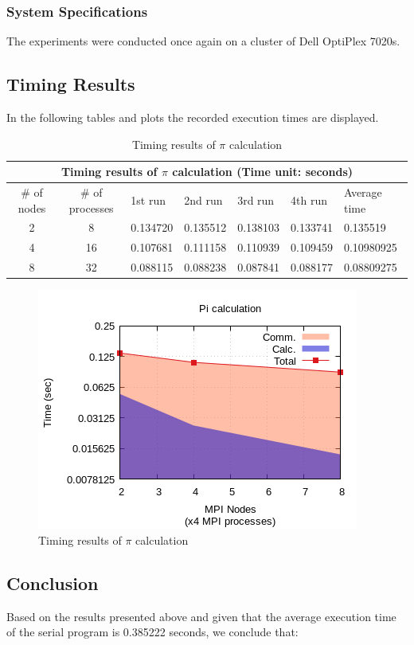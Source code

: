 \documentclass{article}
\begin{document}
\subsubsection{System Specifications}
The experiments were conducted once again on a cluster of Dell OptiPlex 7020s.

\subsection{Timing Results}
In the following tables and plots the recorded execution times are displayed.


\begin{table}[htbp]
  \centering
    \begin{tabular}{|c c||l l l l| l|} 
    \hline
    \multicolumn{7}{|c|}{Timing results of $\pi$ calculation (Time unit: seconds)} \\
    \hline
    \# of nodes & \# of processes & 1st run & 2nd run & 3rd run & 4th run & Average time\\ [0.5ex]
    \hline\hline
    2 & 8 & 0.134720 & 0.135512 & 0.138103 & 0.133741 & 0.135519 \\ 
    \hline
    4 & 16 & 0.107681 & 0.111158 & 0.110939 & 0.109459 & 0.10980925 \\
    \hline
    8 & 32 & 0.088115 & 0.088238 & 0.087841 & 0.088177 & 0.08809275 \\ [1ex]
    \hline
    \end{tabular}
  \caption{Timing results of $\pi$ calculation}
\end{table}


\begin{figure}[htbp]
  \centering
  \includegraphics[width=0.55\columnwidth]{../../hw3/ex3/plots/pi.png}
  \caption{Timing results of $\pi$ calculation}
\end{figure}

\newpage
\subsection{Conclusion}
Based on the results presented above and given that the average execution time of the serial
program is 0.385222 seconds, we conclude that:
\end{document}
